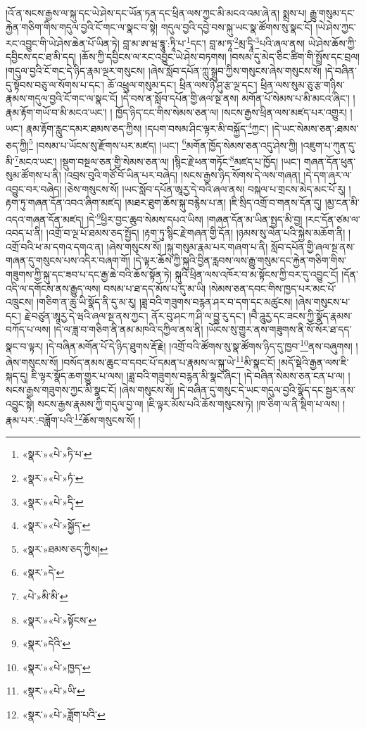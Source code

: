 །འོ་ན་སངས་རྒྱས་ལ་སྐུ་དང་ཡེ་ཤེས་དང་ཡོན་ཏན་དང་ཕྲིན་ལས་ཀྱང་མི་མངའ་འམ་ཞེ་ན། སྨྲས་པ། རྒྱུ་གསུམ་དང་རྐྱེན་གཅིག་གིས་གདུལ་བྱའི་ངོ་གང་ལ་སྣང་བ་སྟེ། གདུལ་བྱའི་དབྱེ་བས་སྐུ་ཡང་སྣ་ཚོགས་སུ་སྣང་ངོ། །ཡེ་ཤེས་ཀྱང་རང་འབྱུང་གི་ཡེ་ཤེས་ཆེན་པོ་ཡིན་ཏེ། བླ་མ་ཨ་ཝ་དྷཱུ་:ཏཱི་པ་\footnote{«སྣར་»«པེ་»ཏི་པ་}དང་། བླ་མ་ཏཱ་\footnote{«སྣར་»«པེ་»ཏཾ་}མྲ་དྭཱི་\footnote{«སྣར་»«པེ་»དྭི་}པའི་ཞལ་ནས། ཡེ་ཤེས་ཆོས་ཀྱི་དབྱིངས་དང་ཐ་མི་དད། །ཆོས་ཀྱི་དབྱིངས་ལ་རང་འབྱུང་ཡེ་ཤེས་བཏགས། །བསམ་དུ་མེད་ཅིང་ཚིག་གི་སྤྲོས་དང་བྲལ། །གདུལ་བྱའི་ངོ་གང་དེ་ཉིད་རྣམ་ལྔར་གསུངས། །ཞེས་སློབ་དཔོན་ཀླུ་སྒྲུབ་ཀྱིས་གསུངས་ཞེས་གསུངས་སོ། །དེ་བཞིན་དུ་སྟོབས་བཅུ་ལ་སོགས་པ་དང་། ཆོ་འཕྲུལ་གསུམ་དང་། ཕྲིན་ལས་ཉི་ཤུ་རྩ་ལྔ་དང་། ཕྲིན་ལས་སུམ་ཅུ་རྩ་གཉིས་རྣམས་གདུལ་བྱའི་ངོ་གང་ལ་སྣང་ངོ། །དེ་བས་ན་སློབ་དཔོན་གྱི་ཞལ་སྔ་ནས། མགོན་པོ་སེམས་པ་མི་མངའ་ཞིང་། །རྣམ་རྟོག་གཡོ་བ་མི་མངའ་ཡང་། །
ཁྱོད་ཉིད་ངང་གིས་སེམས་ཅན་ལ། །སངས་རྒྱས་ཕྲིན་ལས་མཛད་པར་འགྱུར། །ཡང་། རྣམ་རྟོག་རླུང་དམར་ཐམས་ཅད་ཀྱིས། །དཔག་བསམ་ཤིང་ལྟར་མི་བསྐྱོད་\footnote{«སྣར་»«པེ་»སྐྱོད་}ཀྱང་། །དེ་ཡང་སེམས་ཅན་:ཐམས་ཅད་ཀྱི།\footnote{«སྣར་»ཐམས་ཅད་ཀྱིས།} །བསམ་པ་ཡོངས་སུ་རྫོགས་པར་མཛད། །ཡང་། \footnote{«སྣར་»དེ་}མགོན་ཁྱོད་སེམས་ཅན་འདུ་ཤེས་ཀྱི། །འཇུག་པ་ཀུན་དུ་མི་\footnote{«པེ་»མི་མི་}མངའ་ཡང་། །སྡུག་བསྔལ་ཅན་གྱི་སེམས་ཅན་ལ། །སྙིང་རྗེ་ཕན་གཏོང་\footnote{«སྣར་»«པེ་»སྟོངས་}མཛད་པ་ཁྱོད། །ཡང་། གཞན་དོན་ཕུན་སུམ་ཚོགས་པ་ནི། །འབྲས་བུའི་གཙོ་བོ་ཡིན་པར་བཞེད། །སངས་རྒྱས་ཉིད་སོགས་དེ་ལས་གཞན། །དེ་དག་ཞར་ལ་འབྱུང་བར་བཞེད། །ཅེས་གསུངས་སོ། །ཡང་སློབ་དཔོན་ཨཱརྱ་དེ་བའི་ཞལ་ནས། བསྐལ་པ་གྲངས་མེད་མང་པོ་རུ། །རྟག་ཏུ་གཞན་དོན་འབའ་ཞིག་མཛད། །མཐར་ཐུག་ཆོས་སྐུ་བརྙེས་པ་ན། །ཇི་སྲིད་འགྲོ་བ་གནས་དོན་དུ། །མྱ་ངན་མི་འདའ་གཞན་དོན་མཛད། །དེ་\footnote{«སྣར་»དེའི་}ཕྱིར་བྱང་ཆུབ་སེམས་དཔའ་ཡིས། །གཞན་དོན་མ་ཡིན་སྤྱད་མི་བྱ། །རང་དོན་ཙམ་ལ་འབད་པ་ནི། །འགྲོ་བ་ལྔ་པོ་ཐམས་ཅད་སྤྱོད། །རྟག་ཏུ་སྙིང་རྗེ་གཞན་གྱི་དོན། །ཉམས་སུ་ལེན་པའི་སྐྱེས་མཆོག་ནི། །འགྲོ་བའི་ཕ་མ་དགའ་དགའ་ན། །ཞེས་གསུངས་སོ། །སྐུ་གསུམ་རྣམ་པར་གཞག་པ་ནི། སློབ་དཔོན་གྱི་ཞལ་སྔ་ནས་གཞན་དུ་གསུངས་པས་འདིར་བཞག་གོ། །དེ་ལྟར་ཆོས་ཀྱི་སྐུའི་བྱིན་རླབས་ལས་རྒྱུ་གསུམ་དང་རྐྱེན་གཅིག་གིས་གཟུགས་ཀྱི་སྐུ་དང་ཟབ་པ་དང་རྒྱ་ཆེ་བའི་ཆོས་སྟོན་ཏེ། སྐུའི་ཕྲིན་ལས་འཁོར་བ་མ་སྟོངས་ཀྱི་བར་དུ་འབྱུང་ངོ། །དོན་འདི་ལ་དགོངས་ནས་རྒྱུད་ལས། བསམ་པ་ཐ་དད་མོས་པ་དུ་མ་ཡི། །སེམས་ཅན་དབང་གིས་ཁྱད་པར་མང་པོ་འཁྲུངས། །གཅིག་ན་ཆུ་ཡི་སྣོད་ནི་དུ་མ་རུ། །ཟླ་བའི་གཟུགས་བརྙན་ཤར་བ་དག་དང་མཚུངས། །ཞེས་གསུངས་པ་དང་། རྗེ་བཙུན་ཨཱརྱ་དེ་ཝའི་ཞལ་སྔ་ནས་ཀྱང་། ནོར་བུ་ཤང་ཀ་ཤི་ལ་བྱུ་རུ་དང་། །བཻ་ཌཱུརྱ་དང་ཟངས་ཀྱི་སྣོད་རྣམས་བཀོད་པ་ལས། །དེ་ལ་ཟླ་བ་གཅིག་ནི་ནམ་མཁའི་དཀྱིལ་ནས་ནི། །ཡོངས་སུ་གྱུར་ནས་གཟུགས་ནི་སོ་སོར་ཐ་དད་སྣང་བ་ལྟར། །དེ་བཞིན་མགོན་པོ་དེ་ཉིད་ཐུགས་རྡོ་རྗེ། །འགྲོ་བའི་ཚོགས་སུ་སྣ་ཚོགས་ཉིད་དུ་ཁྱབ་\footnote{«སྣར་»«པེ་»ཁྱད་}ནས་བཞུགས། །ཞེས་གསུངས་སོ། །བསོད་ནམས་ཆུང་བ་དབང་པོ་དམན་པ་རྣམས་ལ་སྐུ་ཡེ་\footnote{«སྣར་»«པེ་»ཡི་}མི་སྣང་ངོ། །མདོ་སྡེའི་རྒྱན་ལས་ཇི་སྐད་དུ། ཇི་ལྟར་སྣོད་ཆག་གྱུར་པ་ལས། །ཟླ་བའི་གཟུགས་བརྙན་མི་སྣང་ཞིང་། །དེ་བཞིན་སེམས་ཅན་ངན་པ་ལ། །སངས་རྒྱས་གཟུགས་ཀྱང་མི་སྣང་ངོ། །ཞེས་གསུངས་སོ། །དེ་བཞིན་དུ་གསུང་དེ་ཡང་གདུལ་བྱའི་སྣོད་དང་སྦྱར་ནས་འབྱུང་སྟེ། སངས་རྒྱས་རྣམས་ཀྱི་གདུལ་བྱ་ལ། །ཇི་ལྟར་མོས་པའི་ཆོས་གསུངས་ཏེ། །ཁ་ཅིག་ལ་ནི་སྡིག་པ་ལས། །རྣམ་པར་:བཟློག་པའི་\footnote{«སྣར་»«པེ་»ཟློག་པའི་}ཆོས་གསུངས་སོ། །

